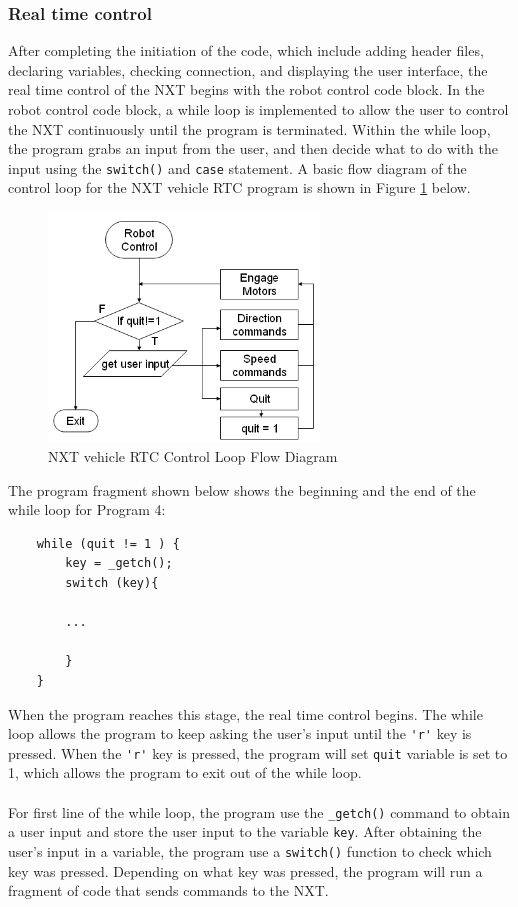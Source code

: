 \documentclass[12pt]{article}
\begin{document}
\subsubsection*{Real time control}
After completing the initiation of the code, which include adding header files, declaring variables,
    checking connection, and displaying the user interface, the real time control of the NXT
    begins with the robot control code block.
In the robot control code block, a while loop is implemented to allow the user to control the NXT
    continuously until the program is terminated.
Within the while loop, the program grabs an input from the user, and then decide what to
    do with the input using the \verb+switch()+ and \verb+case+ statement.
A basic flow diagram of the control loop for the NXT vehicle RTC program is shown in Figure
    \ref{fig_RTC_controlloop} below.
    
\begin{figure}[h]
  \begin{center}
    \includegraphics[height=2.4in]{figure/mindstorm/RTC_controlloop.png}
    \caption{NXT vehicle RTC Control Loop Flow Diagram \label{fig_RTC_controlloop}}
  \end{center}
\end{figure}

The program fragment shown below shows the beginning and the end of the while loop for Program 4:
\begin{verbatim}
    while (quit != 1 ) {
        key = _getch();
        switch (key){
        
        ...
        
        }
    }
\end{verbatim}
When the program reaches this stage, the real time control begins. The while loop allows the program 
to keep asking the user's input until the \verb+'r'+ key is pressed. When the \verb+'r'+ key is 
pressed, the program will set \verb+quit+ variable is set to 1, which allows the program to exit 
out of the while loop.\\ \\
\noindent
For first line of the while loop, the program use the \verb+_getch()+ command to obtain a user
 input and store the user input to the variable \verb+key+. After obtaining the user's input in a 
variable, the program use a \verb+switch()+ function to check which key was pressed. Depending on 
what key was pressed, the program will run a fragment of code that sends commands to the NXT.
\end{document}
